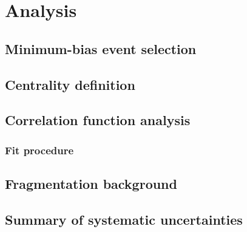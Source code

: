 \chapter{Analysis}
\label{ch:analysis}

\section{Minimum-bias event selection}
\section{Centrality definition}
\section{Correlation function analysis}
\subsection{Fit procedure}
\section{Fragmentation background}
\section{Summary of systematic uncertainties}
